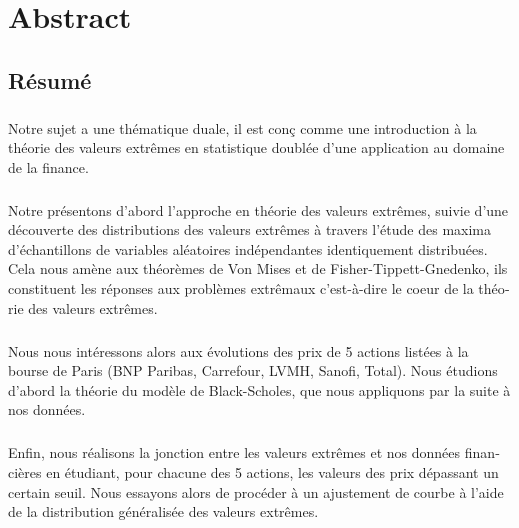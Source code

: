 

\cleardoublepage
\chapter*{Abstract}

\vskip0.5cm


\begin{otherlanguage}{french}
\cleardoublepage
\chapter*{Résumé}
\bigskip
\paragraph{}
Notre sujet a une thématique duale, il est con\c c comme une introduction à la théorie des valeurs extrêmes en statistique doublée d'une application au domaine de la finance.
\paragraph{}
Notre présentons d'abord l'approche en théorie des valeurs extrêmes, suivie d'une découverte des distributions des valeurs extrêmes à travers l'étude des maxima d'échantillons de variables aléatoires indépendantes identiquement distribuées. Cela nous amène aux théorèmes de Von Mises et de Fisher-Tippett-Gnedenko, ils constituent les réponses aux problèmes extrêmaux c'est-à-dire le coeur de la théorie des valeurs extrêmes.
\paragraph{}
Nous nous intéressons alors aux évolutions des prix de 5 actions listées à la bourse de Paris (BNP Paribas, Carrefour, LVMH, Sanofi, Total). Nous étudions d'abord la théorie du modèle de Black-Scholes, que nous appliquons par la suite à nos données.
\paragraph{}
Enfin, nous réalisons la jonction entre les valeurs extrêmes et nos données financières en étudiant, pour chacune des 5 actions, les valeurs des prix dépassant un certain seuil. Nous essayons alors de procéder à un ajustement de courbe à l'aide de la distribution généralisée des valeurs extrêmes.
\vskip0.5cm
\end{otherlanguage}


